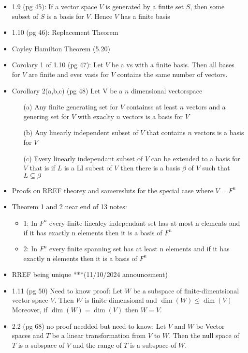 \documentclass[answers,12pt,addpoints]{exam}
\begin{document}
\begin{itemize}
    \item 1.9 (pg 45): If a vector space $V$ is generated by a finite set $S$, then some subset of $S$ is a basis for $V$. Hence $V$ has a finite basis
    \item 1.10 (pg 46): Replacement Theorem
    \item Cayley Hamilton Theorem (5.20)
    \item Corolary 1 of 1.10 (pg 47): Let $V$ be a vs with a finite basis. Then all bases for $V$ are finite and ever vasis for $V$ contains the same number of vectors.
    \item Corollary 2(a,b,c) (pg 48) Let V be a $n$ dimensional vectorspace
    \begin{itemize}
        \item[(a)] Any finite generating set for $V$ containss at least $n$ vectors and a genering set for $V$ with exaclty $n$ vectors is a basis for $V$
        \item[(b)] Any linearly independent subset of $V$ that contains $n$ vectors is a basis for $V$
        \item[(c)] Every linearly independant subset of $V$ can be extended to a basis for $V$ that is if $L$ is a LI subest of $V$ then there is a basis $\beta$ of $ V$ such that $L \subseteq \beta$ 
    \end{itemize}
    \item Proofs on RREF theorey and sameresluts for the special case where $V= F^n$
    \item Theorem 1 and 2 near end of 13 notes: 
    \begin{itemize}
        \item 1: In $F^n$ every finite linealey independant set has at most n elements and if it has exactly n elements then it is a basis of $F^n$
        \item 2: In $F^n$ every finite spanning set has at least n elements and if it has exactly n elements then it is a basis of $F^n$
    \end{itemize}
    \item RREF being unique ***(11/10/2024 announcement)
    \item 1.11 (pg 50) Need to know proof: Let $W$ be a subspace of finite-dimentsional vector space $V$. Then $W$ is finite-dimensional and $\dim(W) \leq \dim(V)$ Moreover, if $\dim(W) = \dim(V)$ then $W = V$.
    \item 2.2 (pg 68) no proof needded but need to know: Let $V$ and $W$ be Vector spaces and $T$ be a linear transformation from $V$ to $W$. Then the null space of $T$ is a subspace of $V$ and the range of $T$ is a subspace of $W$.

\end{itemize}
\end{document}
